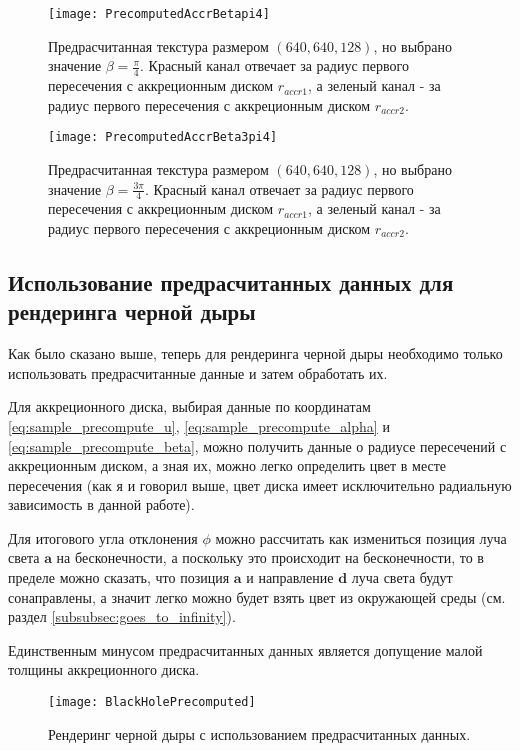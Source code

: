 \newpage

\begin{figure}
    \centering
    \texttt{[image: PrecomputedAccrBetapi4]}
    \caption{Предрасчитанная текстура размером $(640, 640, 128)$, но выбрано значение $\beta = \frac{\pi}{4}$. Красный канал отвечает за радиус первого пересечения с аккреционным диском $r_{accr1}$, а зеленый канал - за радиус первого пересечения с аккреционным диском $r_{accr2}$.}
    \label{fig:precomputed_accr_beta_1pi4}
\end{figure}

\begin{figure}[h]
    \centering
    \texttt{[image: PrecomputedAccrBeta3pi4]}
    \caption{Предрасчитанная текстура размером $(640, 640, 128)$, но выбрано значение $\beta = \frac{3\pi}{4}$. Красный канал отвечает за радиус первого пересечения с аккреционным диском $r_{accr1}$, а зеленый канал - за радиус первого пересечения с аккреционным диском $r_{accr2}$.}
    \label{fig:precomputed_accr_beta_3pi4}
\end{figure}

\newpage

\subsection{Использование предрасчитанных данных для рендеринга черной дыры}
\label{subsec:precompute_black_hole_rendering}

Как было сказано выше, теперь для рендеринга черной дыры необходимо только использовать предрасчитанные данные и затем обработать их.

Для аккреционного диска, выбирая данные по координатам \eqref{eq:sample_precompute_u}, \eqref{eq:sample_precompute_alpha} и \eqref{eq:sample_precompute_beta}, можно получить данные о радиусе пересечений с аккреционным диском, а зная их, можно легко определить цвет в месте пересечения (как я и говорил выше, цвет диска имеет исключительно радиальную зависимость в данной работе).

Для итогового угла отклонения $\phi$ можно рассчитать как измениться позиция луча света $\mathbf{a}$ на бесконечности, а поскольку это происходит на бесконечности, то в пределе можно сказать, что позиция $\mathbf{a}$ и направление $\mathbf{d}$ луча света будут сонаправлены, а значит легко можно будет взять цвет из окружающей среды (см. раздел \ref{subsubsec:goes_to_infinity}).

Единственным минусом предрасчитанных данных является допущение малой толщины аккреционного диска.

\begin{figure}[h]
    \centering
    \texttt{[image: BlackHolePrecomputed]}
    \caption{Рендеринг черной дыры с использованием предрасчитанных данных.}
    \label{fig:black_hole_precomputed}
\end{figure}

\newpage